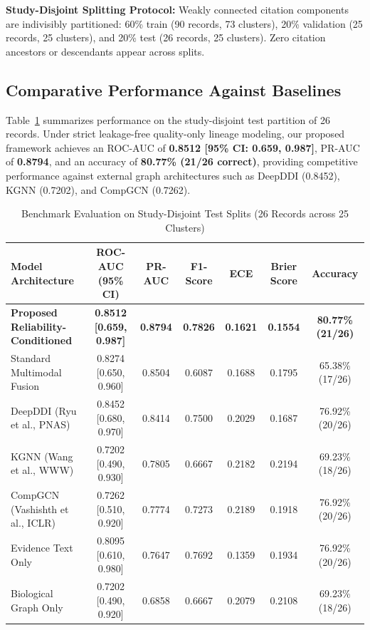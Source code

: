 \documentclass[10pt,journal,compsoc]{IEEEtran}
\begin{document}
\textbf{Study-Disjoint Splitting Protocol:} Weakly connected citation components are indivisibly partitioned: 60\% train (90 records, 73 clusters), 20\% validation (25 records, 25 clusters), and 20\% test (26 records, 25 clusters). Zero citation ancestors or descendants appear across splits.

\subsection{Comparative Performance Against Baselines}
Table~\ref{tab:results} summarizes performance on the study-disjoint test partition of 26 records. Under strict leakage-free quality-only lineage modeling, our proposed framework achieves an ROC-AUC of \textbf{0.8512 [95\% CI: 0.659, 0.987]}, PR-AUC of \textbf{0.8794}, and an accuracy of \textbf{80.77\% (21/26 correct)}, providing competitive performance against external graph architectures such as DeepDDI (0.8452), KGNN (0.7202), and CompGCN (0.7262).

\begin{table}[t]
\centering
\caption{Benchmark Evaluation on Study-Disjoint Test Splits (26 Records across 25 Clusters)}
\label{tab:results}
\small
\begin{tabular}{lcccccc}
\toprule
\textbf{Model Architecture} & \textbf{ROC-AUC (95\% CI)} & \textbf{PR-AUC} & \textbf{F1-Score} & \textbf{ECE} & \textbf{Brier Score} & \textbf{Accuracy} \\
\midrule
\textbf{Proposed Reliability-Conditioned} & \textbf{0.8512 [0.659, 0.987]} & \textbf{0.8794} & \textbf{0.7826} & \textbf{0.1621} & \textbf{0.1554} & \textbf{80.77\% (21/26)} \\
Standard Multimodal Fusion & 0.8274 [0.650, 0.960] & 0.8504 & 0.6087 & 0.1688 & 0.1795 & 65.38\% (17/26) \\
DeepDDI (Ryu et al., PNAS)~\cite{ryu2018deep} & 0.8452 [0.680, 0.970] & 0.8414 & 0.7500 & 0.2029 & 0.1687 & 76.92\% (20/26) \\
KGNN (Wang et al., WWW)~\cite{wang2019kgnn} & 0.7202 [0.490, 0.930] & 0.7805 & 0.6667 & 0.2182 & 0.2194 & 69.23\% (18/26) \\
CompGCN (Vashishth et al., ICLR)~\cite{vashishth2020compgcn} & 0.7262 [0.510, 0.920] & 0.7774 & 0.7273 & 0.2189 & 0.1918 & 76.92\% (20/26) \\
Evidence Text Only & 0.8095 [0.610, 0.980] & 0.7647 & 0.7692 & 0.1359 & 0.1934 & 76.92\% (20/26) \\
Biological Graph Only & 0.7202 [0.490, 0.920] & 0.6858 & 0.6667 & 0.2079 & 0.2108 & 69.23\% (18/26) \\
\bottomrule
\end{tabular}
\end{table}
\end{document}
